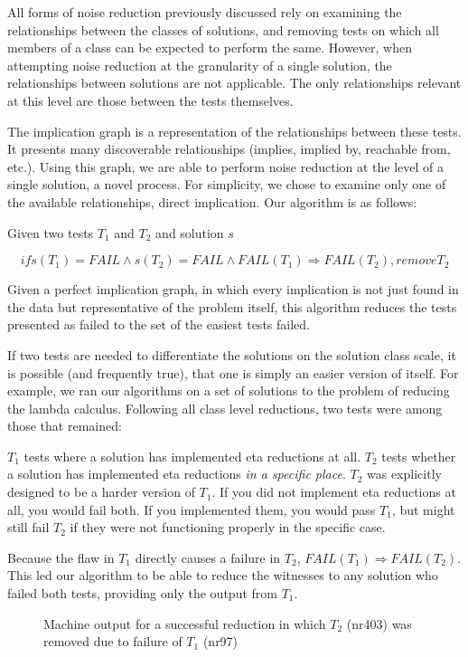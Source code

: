 \documentclass[11pt,twoside]{article}
\begin{document}
All forms of noise reduction previously discussed rely on examining the relationships between the classes of solutions, and removing tests on which all members of a  class can be expected to perform the same. However, when attempting noise reduction at the granularity of a single solution, the relationships between solutions are not applicable. The only relationships relevant at this level  are those between the tests themselves.

The implication graph is a representation of the relationships between these tests. It presents many discoverable relationships (implies, implied by, reachable from, etc.). Using this graph, we are able to perform noise reduction at the level of a single solution, a novel process. For simplicity, we chose to examine only one of the available relationships, direct implication. Our algorithm is as follows:

\centerline{Given two tests $T_1$ and $T_2$ and solution $s$}
$$if s(T_1) = FAIL \wedge s(T_2) = FAIL \wedge FAIL(T_1) \Rightarrow FAIL(T_2), remove T_2$$

Given a perfect implication graph, in which every implication is not just found in the data but representative of the problem itself, this algorithm reduces the tests presented as  failed to the set of the easiest tests failed. 

If two tests are needed to differentiate the solutions on the solution class scale, it is possible (and frequently true), that one is simply an easier version of itself. For example, we ran our algorithms on a set of solutions to the problem of reducing the lambda calculus. Following all class level reductions, two tests were among those that remained:



$T_1$ tests where a solution has implemented eta reductions at all. $T_2$ tests whether a solution has implemented eta reductions \emph{in a specific place}. $T_2$ was explicitly designed to be a harder version of $T_1$. If you did not implement eta reductions at all, you would fail both. If you implemented them, you would pass $T_1$, but might still fail $T_2$ if they were not functioning properly in the specific case.

Because the flaw in $T_1$ directly causes a failure in $T_2$, $FAIL(T_1) \Rightarrow FAIL(T_2)$. This led our algorithm to be able to reduce the witnesses to any solution who failed both tests, providing only the output from $T_1$.

\begin{figure}

\caption{Machine output for a successful reduction in which $T_2$ (nr403) was removed due to failure of $T_1$ (nr97)}
\end{figure}
\end{document}
